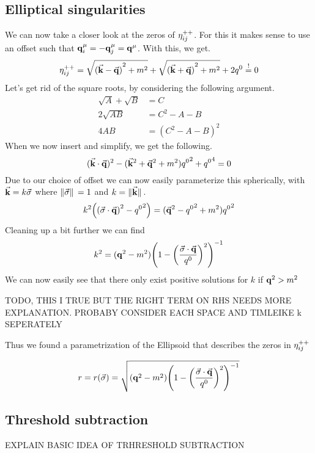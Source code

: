 \subsection{Elliptical singularities}
We can now take a closer look at the zeros of $\eta_{ij}^{++}$.
For this it makes sense to use an offset such that $\vb{q}_i^\mu = -\vb{q}_j^\mu = \vb{q}^\mu$.
With this, we get.
\begin{equation}
    \eta_{ij}^{++} =  \sqrt{{(\va{k}-\va{q})}^2+m^2} + \sqrt{{(\va{k}+\va{q})}^2+m^2} + 2q^0 \overset{!}{=} 0
\end{equation}
Let's get rid of the square roots, by considering the following argument.
\begin{align}
    \sqrt{A}+\sqrt{B} &= C\\
    2\sqrt{AB} &= C^2-A-B\\
    4AB &= (C^2-A-B)^2
\end{align}
When we now insert and simplify, we get the following.
\begin{equation}
    (\va{k}\cdot\va{q})^2-(\va{k}^2+\va{q}^2+m^2){q^0}^2+{q^0}^4 = 0
\end{equation}
Due to our choice of offset we can now easily parameterize this spherically, with $\va{k} = k\va{\sigma}$ where $\norm*{\va{\sigma}} = 1$ and $k = \norm*{\va{k}}$.
\begin{align}
    k^2 \qty(\qty({\va{\sigma}\cdot\va{q}})^2-{q^0}^2) = (\va{q}^2-{q^0}^2+m^2){q^0}^2
\end{align}
Cleaning up a bit further we can find
\begin{align}
    k^2 = (\vb{q}^2-m^2){\qty(1-{\qty(\frac{\va{\sigma}\cdot\va{q}}{q^0})^2})}^{-1}
\end{align}
We can now easily see that there only exist positive solutions for $k$ if $\vb{q}^2>m^2$

TODO, THIS I TRUE BUT THE RIGHT TERM ON RHS NEEDS MORE EXPLANATION. PROBABY CONSIDER EACH SPACE AND TIMLEIKE k SEPERATELY

Thus we found a parametrization of the Ellipsoid that describes the zeros in $\eta_{ij}^{++}$

\begin{equation}
    r = r(\va{\sigma}) = \sqrt{(\vb{q}^2-m^2){\qty(1-{\qty(\frac{\va{\sigma}\cdot\va{q}}{q^0})^2})}^{-1}}
\end{equation}

\subsection{Threshold subtraction}
EXPLAIN BASIC IDEA OF TRHRESHOLD SUBTRACTION

